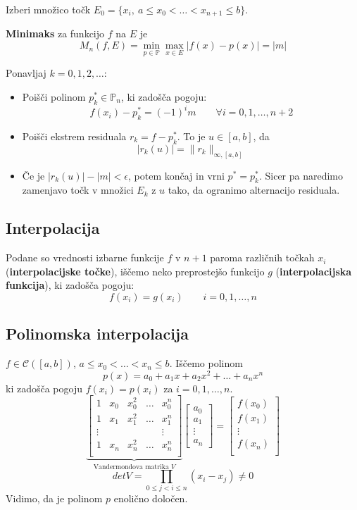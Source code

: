 \begin{multicols}{5}
Izberi množico točk $E_0 = \{ x_i,\ a \leq x_0 < \dots < x_{n+1} \leq b \}$.

\textbf{Minimaks} za funkcijo $f$ na $E$ je
\[M_n(f, E) = \min_{p \in \mathbb{P}} \max_{x \in E} | f(x) - p(x) | = |m|\]

Ponavljaj $k = 0, 1, 2, \dots$:
\begin{itemize}
    \item Poišči polinom $p_k^* \in \mathbb{P}_n$, ki zadošča pogoju:
    \[ f(x_i) - p_k^* = (-1)^i m \qquad \forall i = 0, 1, \dots, n+2 \]
    \item Poišči ekstrem residuala $r_k = f - p_k^*$. To je $u \in [a,b]$, da
    \[ |r_k(u)| = \| r_k \|_{\infty, [a,b]} \]
    \item Če je $|r_k(u)| - |m| < \epsilon$, potem končaj in vrni $p^* = p_k^*$. 
    Sicer pa naredimo zamenjavo točk v množici $E_k$ z $u$ tako, da ogranimo alternacijo residuala.
\end{itemize}

\subsection*{Interpolacija}
Podane so vrednosti izbarne funkcije $f$ v $n+1$ paroma različnih točkah $x_i$ (\textbf{interpolacijske točke}),
iščemo neko preprostejšo funkcijo $g$ (\textbf{interpolacijska funkcija}), ki zadošča pogoju:
\[ f(x_i) = g(x_i) \qquad i = 0, 1, \dots, n \]

\subsection*{Polinomska interpolacija}
$f \in \mathcal{C}([a,b])$, $a \leq x_0 < \dots < x_n \leq b$. Iščemo polinom
\[ p(x) = a_0 + a_1 x + a_2 x^2 + \dots + a_n x^n \]
ki zadošča pogoju $f(x_i) = p(x_i)$ za $i = 0, 1, \dots, n$. 
\[
\underbrace{\begin{bmatrix}
    1 & x_0 & x_0^2 & \dots & x_0^n \\
    1 & x_1 & x_1^2 & \dots & x_1^n \\
    \vdots & &        &       & \vdots \\
    1 & x_n & x_n^2 & \dots & x_n^n \\
\end{bmatrix}}_{\text{Vandermondova matrika $V$}}
\begin{bmatrix}
    a_0 \\
    a_1 \\
    \vdots \\
    a_n
\end{bmatrix}
=
\begin{bmatrix}
    f(x_0) \\
    f(x_1) \\
    \vdots \\
    f(x_n) \\
\end{bmatrix}
\]
\[ det V = \prod_{0 \leq j < i \leq n} (x_i - x_j) \neq 0\]
Vidimo, da je polinom $p$ enolično določen.


\end{multicols}
